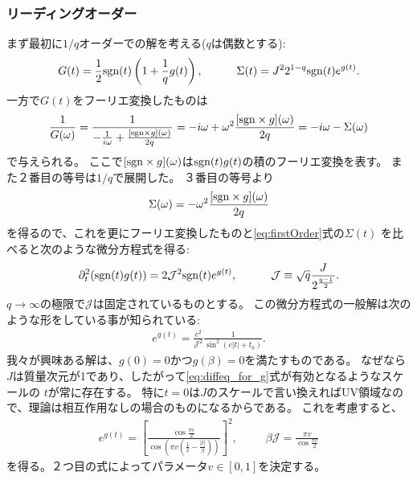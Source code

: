 \subsubsection{リーディングオーダー}
まず最初に$1/q$オーダーでの解を考える($q$は偶数とする):
\begin{align}
  G(t) = \frac{1}{2}\mathrm{sgn}(t)\left(1 + \frac{1}{q}g(t)\right),
  \hspace{30pt}
  \Sigma(t) = J^22^{1-q}\mathrm{sgn}(t)e^{g(t)}.
  \label{eq:firstOrder}
\end{align}
一方で$G(t)$をフーリエ変換したものは
\begin{align}
\frac{1}{G(\omega)}
	= \frac{1}{-\frac{1}{i\omega} + \frac{[\mathrm{sgn} \times g](\omega)}{2q}}
	= -i\omega + \omega^2\frac{[\mathrm{sgn} \times g](\omega)}{2q}
	= -i\omega - \Sigma(\omega)
\end{align}
で与えられる。
ここで$[\mathrm{sgn} \times g](\omega)$は$\mathrm{sgn}(t)g(t)$の積のフーリエ変換を表す。
また２番目の等号は$1/q$で展開した。
３番目の等号より
\begin{align}
	\Sigma(\omega) = -\omega^2\frac{[\mathrm{sgn} \times g](\omega)}{2q}
\end{align}
を得るので、これを更にフーリエ変換したものと\eqref{eq:firstOrder}式の$\Sigma(t)$
を比べると次のような微分方程式を得る:
\begin{align}
\partial_t^2(\mathrm{sgn}(t)g(t)) = 2\mathcal{J}^2\mathrm{sgn}(t)e^{g(t)},
\hspace{30pt}
\mathcal{J} \equiv \sqrt{q}\frac{J}{2^{\frac{q-1}{2}}}.
\label{eq:diffeq_for_g}
\end{align}
$q \to \infty$の極限で$\mathcal{J}$は固定されているものとする。
この微分方程式の一般解は次のような形をしている事が知られている:
\begin{align}
e^{g(t)} = \frac{c^2}{\mathcal{J}^2}\frac{1}{\sin^2(c|t| + t_0)}.
\end{align}
我々が興味ある解は、$g(0)=0$かつ$g(\beta)=0$を満たすものである。
なぜなら$J$は質量次元が1であり、したがって\eqref{eq:diffeq_for_g}式が有効となるようなスケールの
$t$が常に存在する。
特に$t=0$は$J$のスケールで言い換えればUV領域なので、理論は相互作用なしの場合のものになるからである。
これを考慮すると、
\begin{align}
	e^{g(t)} = \left[
		\frac{\cos\frac{\pi v}{2}}{\cos\left(\pi v(\frac{1}{2} - \frac{|t|}{\beta})\right)}
		\right]^2,
	\hspace{30pt}
	\beta\mathcal{J} = \frac{\pi v}{\cos\frac{\pi v}{2}}
	\label{eq:explicit_g}
\end{align}
を得る。２つ目の式によってパラメータ$v\in[0, 1]$を決定する。

